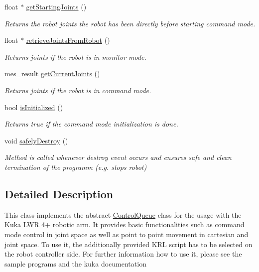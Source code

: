 \begin{DoxyCompactItemize}
float $\ast$ \hyperlink{classKukaControlQueue_a53c5b0fe118ce0847586ccccc1481edb}{get\-Starting\-Joints} ()
\begin{DoxyCompactList}\small\item\em \-Returns the robot joints the robot has been directly before starting command mode. \end{DoxyCompactList}\item 
float $\ast$ \hyperlink{classKukaControlQueue_a4d426306e965f9e81cdad5b10229866f}{retrieve\-Joints\-From\-Robot} ()
\begin{DoxyCompactList}\small\item\em \-Returns joints if the robot is in monitor mode. \end{DoxyCompactList}\item 
mes\-\_\-result \hyperlink{classKukaControlQueue_a363040926a2e014b347cc7016b639f25}{get\-Current\-Joints} ()
\begin{DoxyCompactList}\small\item\em \-Returns joints if the robot is in command mode. \end{DoxyCompactList}\item 
bool \hyperlink{classKukaControlQueue_ae7844ed3c8210152dd0b4a97e9c9f7a6}{is\-Initialized} ()
\begin{DoxyCompactList}\small\item\em \-Returns true if the command mode initialization is done. \end{DoxyCompactList}\item 
void \hyperlink{classKukaControlQueue_ad086a60270e8c6b56c3e09aa1c595b4e}{safely\-Destroy} ()
\begin{DoxyCompactList}\small\item\em \-Method is called whenever destroy event occurs and ensures safe and clean termination of the programm (e.\-g. stops robot) \end{DoxyCompactList}\end{DoxyCompactItemize}


\subsection{\-Detailed \-Description}
\-This class implements the abstract \hyperlink{classControlQueue}{\-Control\-Queue} class for the usage with the \-Kuka \-L\-W\-R 4+ robotic arm. \-It provides basic functionalities such as command mode control in joint space as well as point to point movement in cartesian and joint space. \-To use it, the additionally provided \-K\-R\-L script has to be selected on the robot controller side. \-For further information how to use it, please see the sample programs and the kuka documentation 

